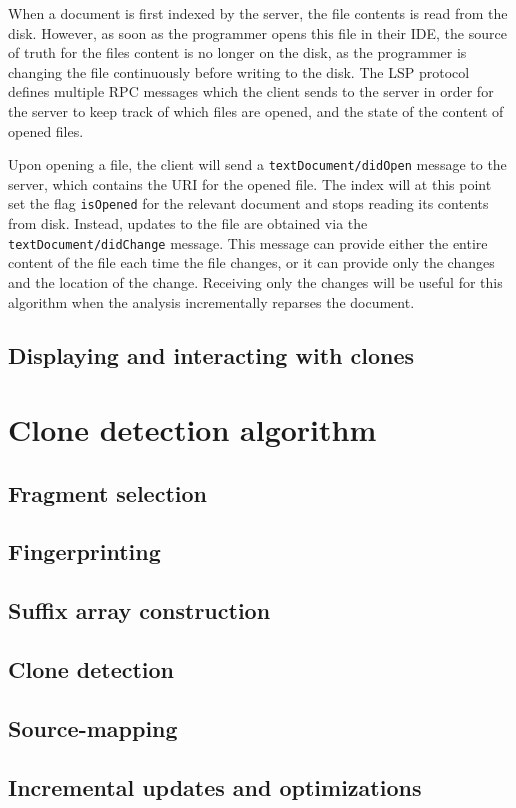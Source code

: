 When a document is first indexed by the server, the file contents is read from the disk.
However, as soon as the programmer opens this file in their IDE, the source of truth for
the files content is no longer on the disk, as the programmer is changing the file
continuously before writing to the disk. The LSP protocol defines multiple RPC
messages which the client sends to the server in order for the server to keep track of
which files are opened, and the state of the content of opened files.

Upon opening a file, the client will send a \verb|textDocument/didOpen| message to the
server, which contains the URI for the opened file. The index will at this point set the
flag \verb|isOpened| for the relevant document and stops reading its contents from disk.
Instead, updates to the file are obtained via the \verb|textDocument/didChange| message.
This message can provide either the entire content of the file each time the file changes,
or it can provide only the changes and the location of the change. Receiving only the
changes will be useful for this algorithm when the analysis incrementally reparses the
document.

\subsection{Displaying and interacting with clones}

\section{Clone detection algorithm}

\subsection{Fragment selection}

\subsection{Fingerprinting}

\subsection{Suffix array construction}

\subsection{Clone detection}

\subsection{Source-mapping}

\subsection{Incremental updates and optimizations}
